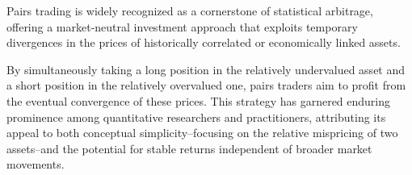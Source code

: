 


Pairs trading is widely recognized as a cornerstone of statistical arbitrage, offering a market-neutral investment approach that exploits temporary divergences in the prices of historically correlated or economically linked assets. 






By simultaneously taking a long position in the relatively undervalued asset and a short position in the relatively overvalued one, pairs traders aim to profit from the eventual convergence of these prices. This strategy has garnered enduring prominence among quantitative researchers and practitioners, attributing its appeal to both conceptual simplicity--focusing on the relative mispricing of two assets--and the potential for stable returns independent of broader market movements.

